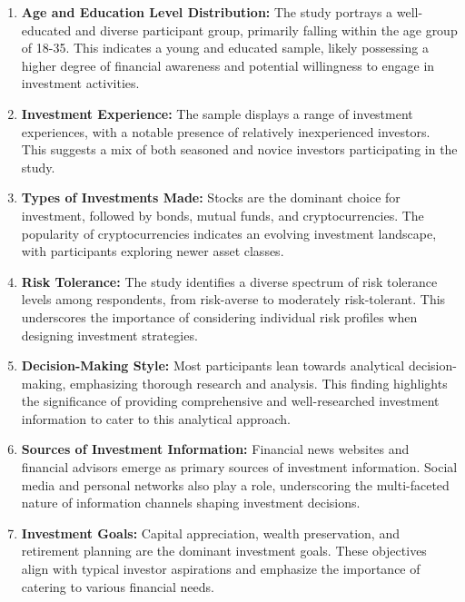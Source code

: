 \begin{enumerate}
    \item \textbf{Age and Education Level Distribution:} The study portrays a well-educated and diverse participant group, primarily falling within the age group of 18-35. This indicates a young and educated sample, likely possessing a higher degree of financial awareness and potential willingness to engage in investment activities.
    
    \item \textbf{Investment Experience:} The sample displays a range of investment experiences, with a notable presence of relatively inexperienced investors. This suggests a mix of both seasoned and novice investors participating in the study.
    
    \item \textbf{Types of Investments Made:} Stocks are the dominant choice for investment, followed by bonds, mutual funds, and cryptocurrencies. The popularity of cryptocurrencies indicates an evolving investment landscape, with participants exploring newer asset classes.
    
    \item \textbf{Risk Tolerance:} The study identifies a diverse spectrum of risk tolerance levels among respondents, from risk-averse to moderately risk-tolerant. This underscores the importance of considering individual risk profiles when designing investment strategies.
    
    \item \textbf{Decision-Making Style:} Most participants lean towards analytical decision-making, emphasizing thorough research and analysis. This finding highlights the significance of providing comprehensive and well-researched investment information to cater to this analytical approach.
    
    \item \textbf{Sources of Investment Information:} Financial news websites and financial advisors emerge as primary sources of investment information. Social media and personal networks also play a role, underscoring the multi-faceted nature of information channels shaping investment decisions.
    
    \item \textbf{Investment Goals:} Capital appreciation, wealth preservation, and retirement planning are the dominant investment goals. These objectives align with typical investor aspirations and emphasize the importance of catering to various financial needs.
    

\end{enumerate}
